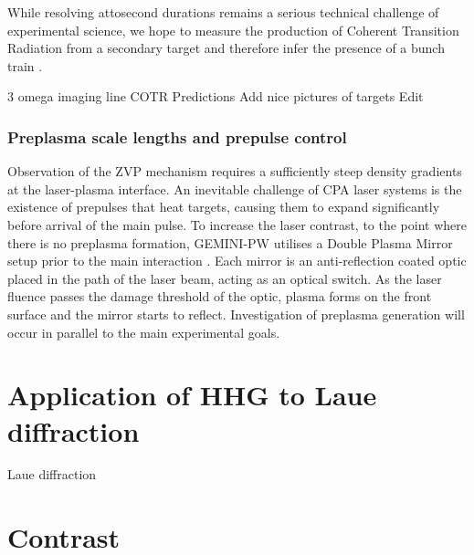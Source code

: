 While resolving attosecond durations remains a serious technical challenge of experimental science, we hope to measure the production of Coherent Transition Radiation from a secondary target and therefore infer the presence of a bunch train \cite{linIsolatedAttosecondElectron2020}. 
 
 3 omega imaging line
 COTR
 Predictions
 Add nice pictures of targets
 Edit
 

\subsubsection{Preplasma scale lengths and prepulse control}
Observation of the ZVP mechanism requires a sufficiently steep density gradients at the laser-plasma interface. An inevitable challenge of \ac{CPA} laser systems is the existence of prepulses that heat targets, causing them to expand significantly before arrival of the main pulse. To increase the laser contrast, to the point where there is no preplasma formation, GEMINI-PW utilises a Double Plasma Mirror setup prior to the main interaction \cite{doumyCompleteCharacterizationPlasma2004}. Each mirror is an anti-reflection coated optic placed in the path of the laser beam, acting as an optical switch. As the laser fluence passes the damage threshold of the optic, plasma forms on the front surface and the mirror starts to reflect. Investigation of preplasma generation will occur in parallel to the main experimental goals.





\section{Application of HHG to Laue diffraction}
Laue diffraction



\section{Contrast}

